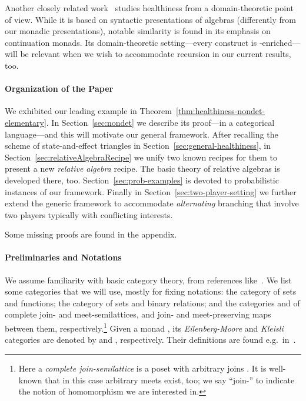 \documentclass[9pt, preprint]{sigplanconf}
\theoremstyle{theorem}
\theoremstyle{definition}
\begin{document}
Another closely related work~\cite{Keimel15}
studies healthiness from a domain-theoretic point of
view. While it is based on syntactic presentations of algebras
(differently from our monadic presentations), notable similarity
is found in its emphasis on continuation monads. Its domain-theoretic
setting---every construct is -enriched---will be relevant
when we wish to accommodate recursion in our current results, too.


\paragraph{Organization of the Paper}
We exhibited our leading example in
Theorem~\ref{thm:healthiness-nondet-elementary}. In
Section~\ref{sec:nondet} we describe its proof---in a categorical
language---and this will motivate our general framework. After
recalling the scheme of state-and-effect triangles
in
Section~\ref{sec:general-healthiness}, in
Section~\ref{sec:relativeAlgebraRecipe} we unify  two known recipes for them to present a
new \emph{relative algebra} recipe. The basic theory of relative
algebras is developed there, too. Section~\ref{sec:prob-examples} is devoted
to probabilistic  instances of our framework. Finally in Section~\ref{sec:two-player-setting}
we
further extend the generic framework to accommodate \emph{alternating}
branching that involve two players typically with conflicting interests.

Some missing proofs are found in the appendix.




\paragraph{Preliminaries and Notations}
We assume familiarity with basic category theory, from references
like~\cite{MacLane71,BarrW85}. We list some categories that we will use, mostly for fixing notations:
 the category   of sets and functions;
 the category   of sets and binary relations;
 and the categories
  and
  of complete join- and meet-semilattices, and
 join- and meet-preserving maps between them,
 respectively.\footnote{Here a \emph{complete join-semilattice} is a
 poset with arbitrary joins . It is well-known that in this case
 arbitrary meets  exist, too; we say ``join-'' to indicate the notion of
homomorphism we are interested in.
 } Given a monad ,
 its \emph{Eilenberg-Moore} and \emph{Kleisli} categories are denoted
 by  and , respectively. Their definitions are found
 e.g.\ in~\cite{MacLane71,BarrW85}.
\end{document}
